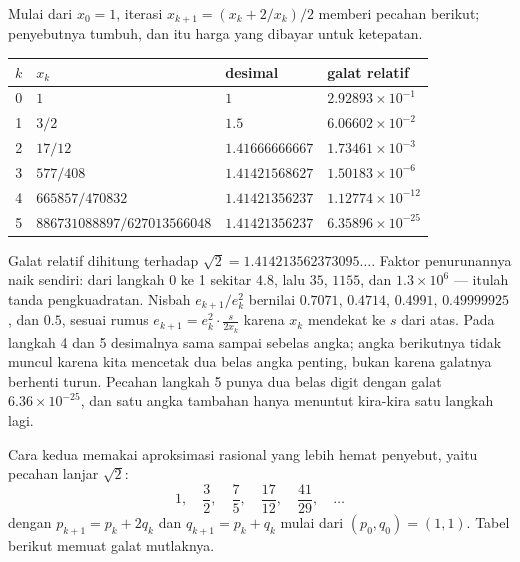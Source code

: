 Mulai dari $x_0=1$, iterasi $x_{k+1}=(x_k+2/x_k)/2$ memberi pecahan berikut; penyebutnya
tumbuh, dan itu harga yang dibayar untuk ketepatan.

\begin{center}\small
\begin{tabular}{rlll}
\hline
$k$ & $x_k$ & desimal & galat relatif \\
\hline
0 & $1$ & $1$ & $2.92893\times10^{-1}$ \\
1 & $3/2$ & $1.5$ & $6.06602\times10^{-2}$ \\
2 & $17/12$ & $1.41666666667$ & $1.73461\times10^{-3}$ \\
3 & $577/408$ & $1.41421568627$ & $1.50183\times10^{-6}$ \\
4 & $665857/470832$ & $1.41421356237$ & $1.12774\times10^{-12}$ \\
5 & $886731088897/627013566048$ & $1.41421356237$ & $6.35896\times10^{-25}$ \\
\hline
\end{tabular}
\end{center}

Galat relatif dihitung terhadap $\sqrt{2}=1.414213562373095\ldots$. Faktor
penurunannya naik sendiri: dari langkah 0 ke 1 sekitar $4.8$, lalu $35$, $1155$, dan
$1.3\times10^{6}$ --- itulah tanda pengkuadratan. Nisbah $e_{k+1}/e_k^2$ bernilai
$0.7071$, $0.4714$, $0.4991$, $0.49999925$, dan $0.5$, sesuai rumus
$e_{k+1}=e_k^2\cdot\frac{s}{2x_k}$ karena $x_k$ mendekat ke $s$ dari atas. Pada langkah
4 dan 5 desimalnya sama sampai sebelas angka; angka berikutnya tidak muncul karena kita
mencetak dua belas angka penting, bukan karena galatnya berhenti turun. Pecahan langkah
5 punya dua belas digit dengan galat $6.36\times10^{-25}$, dan satu angka tambahan hanya
menuntut kira-kira satu langkah lagi.

Cara kedua memakai aproksimasi rasional yang lebih hemat penyebut, yaitu pecahan lanjar
$\sqrt2$:
\[
1,\quad \frac32,\quad \frac75,\quad \frac{17}{12},\quad \frac{41}{29},\quad \ldots
\]
dengan $p_{k+1}=p_k+2q_k$ dan $q_{k+1}=p_k+q_k$ mulai dari $(p_0,q_0)=(1,1)$. Tabel
berikut memuat galat mutlaknya.


